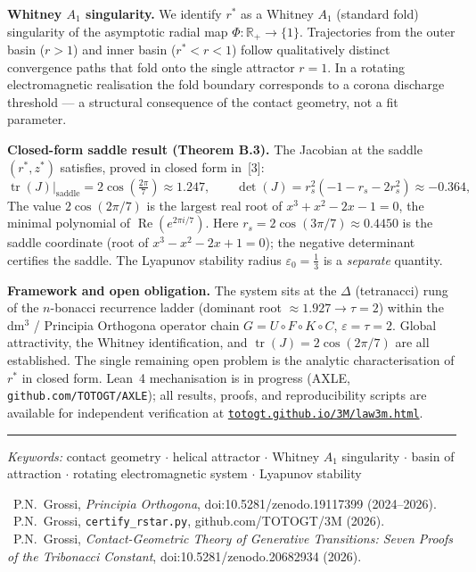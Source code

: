 \documentclass[11pt]{article}
\begin{document}
\textbf{Whitney $A_1$ singularity.}
We identify $r^*$ as a Whitney $A_1$ (standard fold) singularity of the asymptotic radial map
$\Phi:\mathbb{R}_+\to\{1\}$. Trajectories from the outer basin ($r>1$) and inner basin ($r^*<r<1$)
follow qualitatively distinct convergence paths that fold onto the single attractor $r=1$.
In a rotating electromagnetic realisation the fold boundary corresponds to a corona discharge
threshold --- a structural consequence of the contact geometry, not a fit parameter.

\textbf{Closed-form saddle result (Theorem B.3).}
The Jacobian at the saddle $(r^*,z^*)$ satisfies, proved in closed form in~[3]:
\[
\operatorname{tr}(J)\big|_{\mathrm{saddle}} = 2\cos\!\left(\tfrac{2\pi}{7}\right)\approx1.247,
\qquad
\det(J) = r_s^2(-1-r_s-2r_s^2) \approx -0.364,
\]
The value $2\cos(2\pi/7)$ is the largest real root of $x^3+x^2-2x-1=0$, the minimal polynomial
of $\operatorname{Re}(e^{2\pi i/7})$. Here $r_s=2\cos(3\pi/7)\approx0.4450$ is the saddle coordinate
(root of $x^3-x^2-2x+1=0$); the negative determinant certifies the saddle.
The Lyapunov stability radius $\varepsilon_0=\tfrac{1}{3}$ is a \emph{separate} quantity.

\textbf{Framework and open obligation.}
The system sits at the $\Delta$ (tetranacci) rung of the $n$-bonacci recurrence ladder
(dominant root $\approx1.927\to\tau=2$) within the dm$^3$ / Principia Orthogona operator chain
$G=U\circ F\circ K\circ C$, $\varepsilon=\tau=2$. Global attractivity, the Whitney identification,
and $\operatorname{tr}(J)=2\cos(2\pi/7)$ are all established. The single remaining open problem
is the analytic characterisation of $r^*$ in closed form. Lean~4 mechanisation is in progress
(AXLE, \texttt{github.com/TOTOGT/AXLE}); all results, proofs, and reproducibility scripts are
available for independent verification at
\href{https://totogt.github.io/3M/law3m.html}{\texttt{totogt.github.io/3M/law3m.html}}.

\vspace{3pt}\rule{\linewidth}{0.4pt}\vspace{2pt}

\noindent\textit{Keywords:} contact geometry $\cdot$ helical attractor $\cdot$ Whitney $A_1$
singularity $\cdot$ basin of attraction $\cdot$ rotating electromagnetic system $\cdot$ Lyapunov stability

\vspace{2pt}
\noindent[1]~P.N.~Grossi, \textit{Principia Orthogona}, doi:10.5281/zenodo.19117399 (2024--2026).\\
\noindent[2]~P.N.~Grossi, \texttt{certify\_rstar.py}, github.com/TOTOGT/3M (2026).\\
\noindent[3]~P.N.~Grossi, \textit{Contact-Geometric Theory of Generative Transitions: Seven Proofs of the Tribonacci Constant}, doi:10.5281/zenodo.20682934 (2026).
\end{document}
